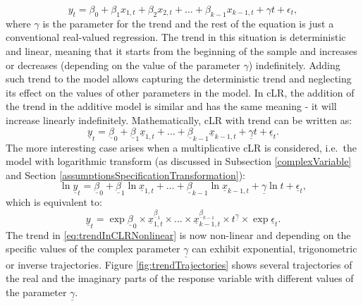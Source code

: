 \documentclass[
]{book}
\begin{document}
\begin{equation}
    {y}_t = {\beta}_0 + {\beta}_1 {x}_{1,t} + {\beta}_2 {x}_{2,t} + \dots + {\beta}_{k-1} {x}_{k-1,t} + \gamma t + {\epsilon}_t,
    \label{eq:trendInRealModel}
\end{equation}
where \(\gamma\) is the parameter for the trend and the rest of the equation is just a conventional real-valued regression. The trend in this situation is deterministic and linear, meaning that it starts from the beginning of the sample and increases or decreases (depending on the value of the parameter \(\gamma\)) indefinitely. Adding such trend to the model allows capturing the deterministic trend and neglecting its effect on the values of other parameters in the model. In cLR, the addition of the trend in the additive model is similar and has the same meaning - it will increase linearly indefinitely. Mathematically, cLR with trend can be written as:
\begin{equation}
    \underline{y}_t = \underline{\beta}_0 + \underline{\beta}_1 \underline{x}_{1,t} + \dots + \underline{\beta}_{k-1} \underline{x}_{k-1,t} + \underline{\gamma} t + \underline{\epsilon}_t .
    \label{eq:trendInCLR}
\end{equation}
The more interesting case arises when a multiplicative cLR is considered, i.e.~the model with logarithmic transform (as discussed in Subsection \ref{complexVariable} and Section \ref{assumptionsSpecificationTransformation}):
\begin{equation}
    \ln \underline{y}_t = \underline{\beta}_0 + \underline{\beta}_1 \ln \underline{x}_{1,t} + \dots + \underline{\beta}_{k-1} \ln \underline{x}_{k-1,t} + \underline{\gamma} \ln t + \underline{\epsilon}_t ,
    \label{eq:trendInCLRLogs}
\end{equation}
which is equivalent to:
\begin{equation}
    \underline{y}_t = \exp \underline{\beta}_0 \times \underline{x}_{1,t}^{\underline{\beta}_1} \times \dots \times \underline{x}_{k-1,t}^{\underline{\beta}_{k-1}} \times t^{\underline{\gamma}} \times \exp \underline{\epsilon}_t .
    \label{eq:trendInCLRNonlinear}
\end{equation}
The trend in \eqref{eq:trendInCLRNonlinear} is now non-linear and depending on the specific values of the complex parameter \(\underline{\gamma}\) can exhibit exponential, trigonometric or inverse trajectories. Figure \ref{fig:trendTrajectories} shows several trajectories of the real and the imaginary parts of the response variable with different values of the parameter \(\underline{\gamma}\).
\end{document}
